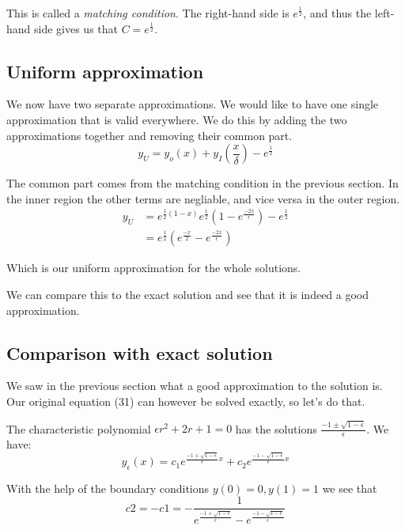 \documentclass[12pt]{article}
\begin{document}
This is called a \textit{matching condition}. The right-hand side is
$e^{\frac{1}{2}}$, and thus the left-hand side gives us that $C =
e^{\frac{1}{2}}$.

\subsection{Uniform approximation}

We now have two separate approximations. We would like to have one single
approximation that is valid everywhere. We do this by adding the two
approximations together and removing their common part.
\begin{equation}
y_U = y_o(x) + y_I(\frac{x}{\delta}) - e^{\frac{1}{2}}
\end{equation}

The common part comes from the matching condition in the previous section. In
the inner region the other terms are negliable, and vice versa in the outer
region.
\begin{align}
y_U &= e^{\frac{1}{2}(1-x)} e^{\frac{1}{2}}(1 - e^{\frac{-2x}{\epsilon}}) -
e^{\frac{1}{2}} \\
    &=  e^{\frac{1}{2}}(e^{\frac{-x}{2}} - e^{\frac{-2x}{\epsilon}})
\end{align}

Which is our uniform approximation for the whole solutions.

We can compare this to the exact solution and see that it is indeed a good
approximation.

\subsection{Comparison with exact solution}

We saw in the previous section what a good approximation to the
solution is. Our original equation (31) can however be solved exactly,
so let's do that.

The characteristic polynomial $\epsilon r^2 +2r + 1 = 0$ has the solutions
$\frac{-1 \pm \sqrt{1-\epsilon}}{\epsilon}$. We have:
\begin{equation}
y_{\epsilon}(x)=c_1 e^{\frac{-1 + \sqrt{1-\epsilon}}{\epsilon} x} + c_2
e^{\frac{-1 - \sqrt{1-\epsilon}}{\epsilon} x}
\end{equation}

With the help of the boundary conditions $y(0)=0, y(1)=1$ we see that
\begin{equation}
  c2 = - c1 = - \frac{1}{e^{\frac{-1 + \sqrt{1-\epsilon}}{\epsilon}}
    - e^{\frac{-1 - \sqrt{1-\epsilon}}{\epsilon}}}
\end{equation}
\end{document}
